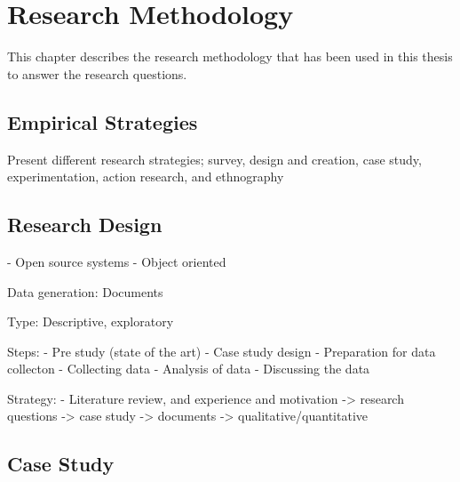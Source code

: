 
\chapter{Research Methodology}

This chapter describes the research methodology that has been used in this thesis to answer the research questions. 

\section{Empirical Strategies}
Present different research strategies; survey, design and creation, case study, experimentation, action research, and ethnography



\section{Research Design}

- Open source systems
- Object oriented


Data generation: Documents

Type: Descriptive, exploratory

Steps:
- Pre study (state of the art)
- Case study design
- Preparation for data collecton
- Collecting data
- Analysis of data
- Discussing the data


Strategy:
- Literature review, and experience and motivation -> research questions -> case study -> documents -> qualitative/quantitative



\section{Case Study}


